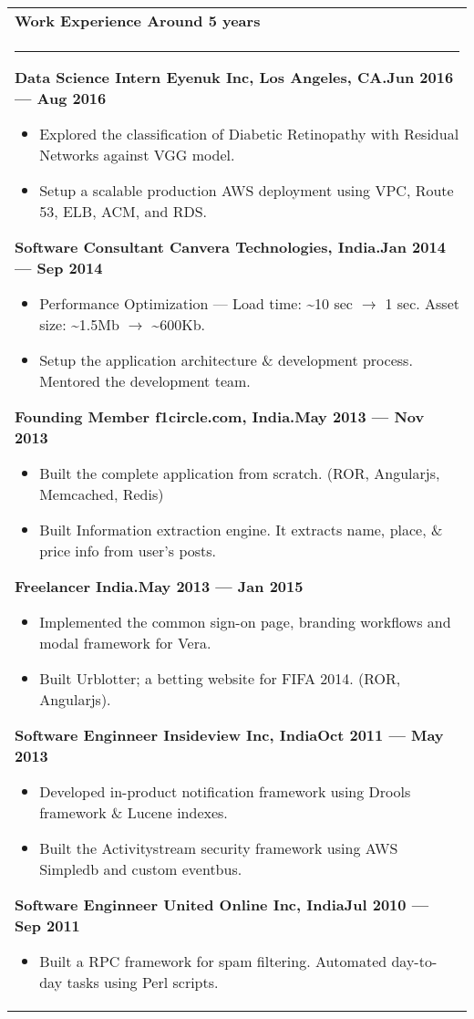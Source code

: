 \documentclass{article}
\begin{document}
\begin{tabular}{p{\dimexpr\linewidth-2\tabcolsep}}
	\bfseries \large{Work Experience} \hfill Around 5 years \\
	\noindent\rule{\textwidth}{0.4pt}
	{\bfseries Data Science Intern \hfill Eyenuk Inc, Los Angeles, CA\@.\hfill Jun 2016 --- Aug 2016}
	\begin{itemize}
		\item Explored the classification of Diabetic Retinopathy with Residual Networks against VGG model.
		\item Setup a scalable production AWS deployment using VPC, Route 53, ELB, ACM, and RDS\@.
	\end{itemize}

	\bigskip
	{\bfseries Software Consultant \hfill Canvera Technologies, India\@.\hfill Jan 2014 --- Sep 2014}
	\begin{itemize}
		\item Performance Optimization --- Load time: \textasciitilde10 sec \( \rightarrow \) 1 sec. Asset size: \textasciitilde1.5Mb \( \rightarrow \) \textasciitilde600Kb.
		\item Setup the application architecture \& development process. Mentored the development team.
	\end{itemize}
	\bigskip 
	{\bfseries Founding Member \hfill f1circle.com, India\@.\hfill May 2013 --- Nov 2013}
	\begin{itemize}
		\item Built the complete application from scratch. (ROR, Angularjs, Memcached, Redis)
		\item Built Information extraction engine. It extracts name, place, \& price info from user's posts.
	\end{itemize}
	\bigskip
	{\bfseries Freelancer \hfill India.\hfill May 2013 --- Jan 2015}
	\begin{itemize}
		\item Implemented the common sign-on page, branding workflows and modal framework for Vera.
		\item Built Urblotter; a betting website for FIFA 2014. (ROR, Angularjs).
	\end{itemize}
	\bigskip
	{\bfseries Software Enginneer \hfill Insideview Inc, India\hfill Oct 2011 --- May 2013}
	\begin{itemize}
		\item Developed in-product notification framework using Drools framework \& Lucene indexes.
		\item Built the Activitystream security framework using AWS Simpledb and custom eventbus.
	\end{itemize}
	\bigskip
	{\bfseries Software Enginneer \hfill United Online Inc, India\hfill Jul 2010 --- Sep 2011}
	\begin{itemize}
		\item Built a RPC framework for spam filtering.  Automated day-to-day tasks using Perl scripts.
	\end{itemize}
\end{tabular}
\end{document}
